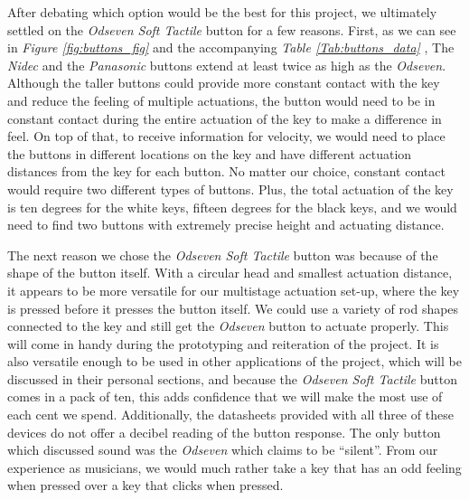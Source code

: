 \begin{table}[h!]
  \centering
  \caption{A comparison of costs for our button options}
  \label{Tab:buttons_data}
\end{table}

After debating which option would be the best for this project, we ultimately settled on the \textit{Odseven Soft Tactile} button for a few reasons. First, as we can see in \textit{Figure \ref{fig:buttons_fig}} and the accompanying \textit{Table \ref{Tab:buttons_data}} , The \textit{Nidec} and the \textit{Panasonic} buttons extend at least twice as high as the \textit{Odseven}. Although the taller buttons could provide more constant contact with the key and reduce the feeling of multiple actuations, the button would need to be in constant contact during the entire actuation of the key to make a difference in feel. On top of that, to receive information for velocity, we would need to place the buttons in different locations on the key and have different actuation distances from the key for each button. No matter our choice, constant contact would require two different types of buttons. Plus, the total actuation of the key is ten degrees for the white keys, fifteen degrees for the black keys, and we would need to find two buttons with extremely precise height and actuating distance.

The next reason we chose the \textit{Odseven Soft Tactile} button was because of the shape of the button itself. With a circular head and smallest actuation distance, it appears to be more versatile for our multistage actuation set-up, where the key is pressed before it presses the button itself. We could use a variety of rod shapes connected to the key and still get the \textit{Odseven} button to actuate properly. This will come in handy during the prototyping and reiteration of the project. It is also versatile enough to be used in other applications of the project, which will be discussed in their personal sections, and because the \textit{Odseven Soft Tactile} button comes in a pack of ten, this adds confidence that we will make the most use of each cent we spend. Additionally, the datasheets provided with all three of these devices do not offer a decibel reading of the button response. The only button which discussed sound was the \textit{Odseven} which claims to be “silent”. From our experience as musicians, we would much rather take a key that has an odd feeling when pressed over a key that clicks when pressed.

